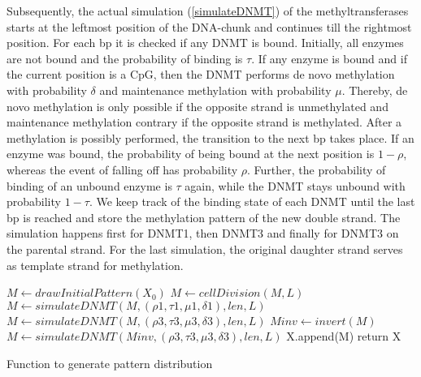 Subsequently, the actual simulation (\ref{simulateDNMT}) of the methyltransferases starts at the leftmost position of the DNA-chunk and continues till the rightmost position. For each \ac{bp} it is checked if any \ac{DNMT} is bound. Initially, all enzymes are not bound and the probability of binding is $\tau$. If any enzyme is bound and if the current position is a \ac{CpG}, then the \ac{DNMT} performs de novo methylation with probability $\delta$ and maintenance methylation with probability $\mu$. Thereby, de novo methylation is only possible if the opposite strand is unmethylated and maintenance methylation contrary if the opposite strand is methylated. After a methylation is possibly performed, the transition to the next \ac{bp} takes place. If an enzyme was bound, the probability of being bound at the next position is $1-\rho$, whereas the event of falling off has probability $\rho$. Further, the probability of binding of an unbound enzyme is $\tau$ again, while the \ac{DNMT} stays unbound with probability $1-\tau$. We keep track of the binding state of each \ac{DNMT} until the last \ac{bp} is reached and store the methylation pattern of the new double strand. The simulation happens first for DNMT1, then DNMT3 and finally for DNMT3 on the parental strand. For the last simulation, the original daughter strand serves as template strand for methylation.\\

\begin{algorithm}
\begin{algorithmic}
 
\State $M \gets drawInitialPattern(X_0)$
		\State $M \gets cellDivision(M, L)$
		\State $M \gets simulateDNMT(M, (\rho1, \tau1, \mu1, \delta1), len, L)$
		\State $M \gets simulateDNMT(M, (\rho3, \tau3, \mu3, \delta3), len, L)$
		\State $Minv \gets invert(M)$
		\State $M \gets simulateDNMT(Minv, (\rho3, \tau3, \mu3, \delta3), len, L)$
		\State X.append(M)
	\EndFor
\EndFor
\State return X
\EndProcedure
\end{algorithmic}
\caption{\label{simulation} Function to generate pattern distribution}
\end{algorithm}

